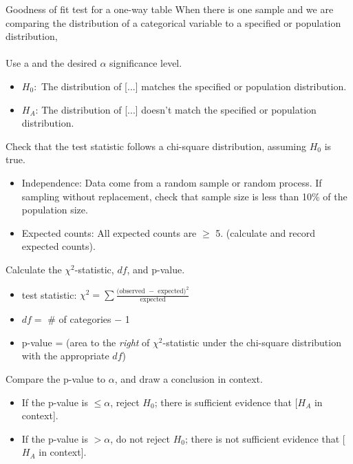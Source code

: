 \begin{onebox}{Goodness of fit test for a one-way table}
 When there is one sample and we are comparing the distribution of a categorical variable to a specified or population distribution, 
\\
\\
 Use a  and the desired $\alpha$ significance level.  
\begin{itemize}
\setlength{\itemsep}{0mm}
\item[]  $H_0$:\, The distribution of [...] matches the specified or population distribution. 
\item[]  $H_A$: The distribution of [...] doesn't match the specified or population distribution.
\end{itemize}
 Check that the test statistic follows a chi-square distribution, assuming $H_0$ is true.\vspace{-1mm}
{\setlength{\leftmargini}{13mm}
\begin{itemize}
\setlength{\itemsep}{0mm}
\item[1.] Independence:  Data come from a random sample or random process.  If sampling 
without replacement, check that sample size is less than 10\% of the population size.
\item[2.] Expected counts:  All expected counts are $\ge$ 5. (calculate and record expected counts).
\end{itemize}
}
 Calculate the $\chi^2$-statistic, $df$, and p-value.\vspace{-1mm}  
\begin{itemize}
\setlength{\itemsep}{0mm}
\item[] test statistic:  $\chi^2 =\sum{ \frac{\text{(observed } - \text{ expected})^2}{\text{expected}}}$ 
\item[] $df =$ \# of categories $-$ 1
\item[] p-value = (area to the \emph{right} of $\chi^2$-statistic under the chi-square distribution with the appropriate $df$)
\end{itemize}
 Compare the p-value to $\alpha$, and draw a conclusion in context.
\begin{itemize}\vspace{-1mm}
\setlength{\itemsep}{0mm}
\item[] If the p-value is $\le \alpha$, reject $H_0$; there is sufficient evidence that [$H_A$ in context]. 
\item[] If the p-value is $> \alpha$, do not reject $H_0$; there is not sufficient evidence that [$H_A$ in context].
\end{itemize}
\end{onebox}


